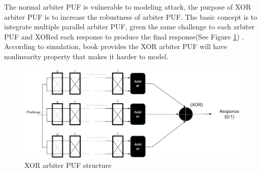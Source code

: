 The normal arbiter PUF is vulnerable to modeling attack, the purpose of XOR arbiter PUF is to increase the robustness of arbiter PUF. The basic concept is to integrate multiple parallel arbiter PUF, given the same challenge to each arbiter PUF and XORed each response to produce the final response(See Figure \ref{fig:figure7}) \cite{Reference5}.
According to simulation, book \cite{Reference4} provides the XOR arbiter PUF will have nonlinearity property that makes it harder to model.

\begin{figure}[htp]
    \centering
    \includegraphics[width=12cm]{figures/figure7.jpg}
    \caption{XOR arbiter PUF structure}
    \label{fig:figure7}
    \end{figure}

